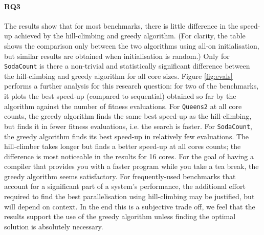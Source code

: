 \paragraph{RQ3} The results show that for most benchmarks, there is little
difference in the speed-up achieved by the hill-climbing and greedy algorithm.
(For clarity, the table shows the comparison only between the two algorithms
using all-on initialisation, but similar results are obtained when
initialisation is random.) Only for \verb|SodaCount| is there a non-trivial and
statistically significant difference between the hill-climbing and greedy
algorithm for all core sizes.  Figure \ref{fig:evals} performs a further
analysis for this research question: for two of the benchmarks, it plots the
best speed-up (compared to sequential) obtained so far by the algorithm against
the number of fitness evaluations.  For \verb|Queens2| at all core counts, the
greedy algorithm finds the same best speed-up as the hill-climbing, but finds
it in fewer fitness evaluations, i.e. the search is faster.  For
\verb|SodaCount|, the greedy algorithm finds its best speed-up in relatively
few evaluations. The hill-climber takes longer but finds a better speed-up at
all cores counts; the difference is most noticeable in the results for 16
cores. For the goal of having a compiler that provides you with a faster
program while you take a tea break, the greedy algorithm seems satisfactory.
For frequently-used benchmarks that account for a significant part of a
system's performance, the additional effort required to find the best
parallelisation using hill-climbing may be justified, but will depend on
context. In the end this is a subjective trade off, we feel that the results
support the use of the greedy algorithm unless finding the optimal solution
is absolutely necessary.


